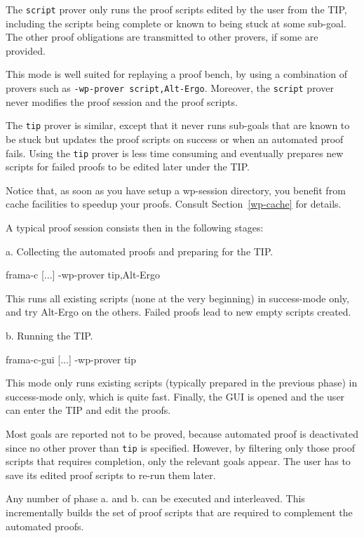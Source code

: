 The \verb+script+ prover only runs the proof scripts edited by the user from the TIP, including the scripts being complete or known to being stuck at some sub-goal. The other proof obligations are transmitted to other provers, if some are provided.

This mode is well suited for replaying a proof bench, by using a combination of provers such as \verb+-wp-prover script,Alt-Ergo+. Moreover, the \verb+script+ prover never modifies the proof session and the proof scripts.

The \verb+tip+ prover is similar, except that it never runs sub-goals that are known to be stuck but updates the proof scripts on success or when an automated proof fails. Using the \verb+tip+ prover is less time consuming and eventually prepares new scripts for failed proofs to be edited later under the TIP.

Notice that, as soon as you have setup a wp-session directory, you benefit from cache facilities to speedup your proofs. Consult Section~\ref{wp-cache} for details.

\clearpage
A typical proof session consists then in the following stages:

a. Collecting the automated proofs and preparing for the TIP.
\begin{logs}
  frama-c [...] -wp-prover tip,Alt-Ergo
\end{logs}

This runs all existing scripts (none at the very beginning) in success-mode only, and try Alt-Ergo on the others. Failed proofs lead to new empty scripts created.

b. Running the TIP.
\begin{logs}
  frama-c-gui [...] -wp-prover tip
\end{logs}

This mode only runs existing scripts (typically prepared in the previous phase) in success-mode only, which is quite fast. Finally, the GUI is opened and the user can enter the TIP and edit the proofs.

Most goals are reported not to be proved, because automated proof is deactivated since no other prover than \verb+tip+ is specified. However, by filtering only those proof scripts that requires completion, only the relevant goals appear. The user has to save its edited proof scripts to re-run them later.

Any number of phase a. and b. can be executed and interleaved. This incrementally builds the set of proof scripts that are required to complement the automated proofs.

